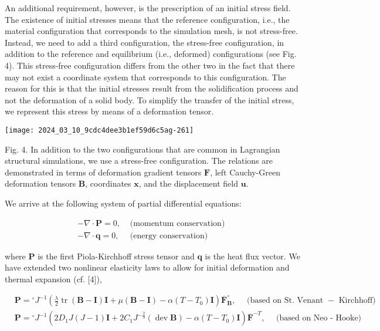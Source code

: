 \documentclass[10pt]{article}
\begin{document}
An additional requirement, however, is the prescription of an initial stress field. The existence of initial stresses means that the reference configuration, i.e., the material configuration that corresponds to the simulation mesh, is not stress-free. Instead, we need to add a third configuration, the stress-free configuration, in addition to the reference and equilibrium (i.e., deformed) configurations (see Fig. 4). This stress-free configuration differs from the other two in the fact that there may not exist a coordinate system that corresponds to this configuration. The reason for this is that the initial stresses result from the solidification process and not the deformation of a solid body. To simplify the transfer of the initial stress, we represent this stress by means of a deformation tensor.

\begin{center}
\texttt{[image: 2024\_03\_10\_9cdc4dee3b1ef59d6c5ag-261]}
\end{center}

Fig. 4. In addition to the two configurations that are common in Lagrangian structural simulations, we use a stress-free configuration. The relations are demonstrated in terms of deformation gradient tensors $\mathbf{F}$, left Cauchy-Green deformation tensors $\mathbf{B}$, coordinates $\mathbf{x}$, and the displacement field $\mathbf{u}$.

We arrive at the following system of partial differential equations:

$$
\begin{array}{ll}
-\nabla \cdot \mathbf{P}=0, & \text { (momentum conservation) } \\
-\nabla \cdot \mathbf{q}=0, & \text { (energy conservation) }
\end{array}
$$

where $\mathbf{P}$ is the first Piola-Kirchhoff stress tensor and $\mathbf{q}$ is the heat flux vector. We have extended two nonlinear elasticity laws to allow for initial deformation and thermal expansion (cf. [4]),

$$
\begin{aligned}
& \mathbf{P}={ }^{\circ} J^{-1}\left(\frac{\lambda}{2} \operatorname{tr}(\mathbf{B}-\mathbf{I}) \mathbf{I}+\mu(\mathbf{B}-\mathbf{I})-\alpha\left(T-T_{0}\right) \mathbf{I}\right) \overline{\mathbf{F}}_{\mathbf{B}}^{\circ}, \quad \text { (based on St. Venant }- \text { Kirchhoff) } \\
& \mathbf{P}={ }^{\circ} J^{-1}\left(2 D_{1} J(J-1) \mathbf{I}+2 C_{1} J^{-\frac{2}{3}}(\operatorname{dev} \mathbf{B})-\alpha\left(T-T_{0}\right) \mathbf{I}\right) \overline{\mathbf{F}}^{-T}, \quad \text { (based on Neo - Hooke) }
\end{aligned}
$$
\end{document}

